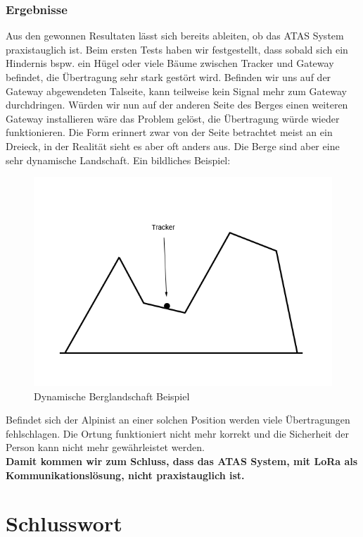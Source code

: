 \documentclass[11pt,english,german]{report}
\theoremstyle{definition}
\begin{document}
\subsection{Ergebnisse}
Aus den gewonnen Resultaten lässt sich bereits ableiten, ob das ATAS System praxistauglich ist. Beim ersten Tests haben wir festgestellt, dass sobald sich ein Hindernis bspw. ein Hügel oder viele Bäume zwischen Tracker und Gateway befindet, die Übertragung sehr stark gestört wird. Befinden wir uns auf der Gateway abgewendeten Talseite, kann teilweise kein Signal mehr zum Gateway durchdringen. Würden wir nun auf der anderen Seite des Berges einen weiteren Gateway installieren wäre das Problem gelöst, die Übertragung würde wieder funktionieren. Die Form erinnert zwar von der Seite betrachtet meist an ein Dreieck, in der Realität sieht es aber oft anders aus. Die Berge sind aber eine sehr dynamische Landschaft. Ein bildliches Beispiel:
\begin{figure}[H]
	\centering
	\includegraphics[width=\textwidth]{img/testing/testing_result.png}
	\caption[Dynamische Berglandschaft Beispiel]
	{Dynamische Berglandschaft Beispiel}
\end{figure}
\noindent
Befindet sich der Alpinist an einer solchen Position werden viele Übertragungen fehlschlagen. Die Ortung funktioniert nicht mehr korrekt und die Sicherheit der Person kann nicht mehr gewährleistet werden. \\[0.3cm]
\textbf{Damit kommen wir zum Schluss, dass das ATAS System, mit LoRa als Kommunikationslösung, nicht praxistauglich ist.}

\chapter{Schlusswort}
\end{document}
